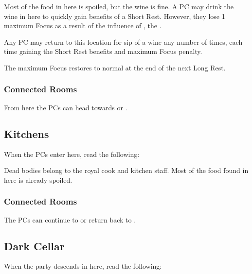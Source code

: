 Most of the food in here is spoiled, but the wine is fine. A PC may drink the wine in here to quickly gain benefits of a Short Rest. However, they lose 1 maximum Focus as a result of the influence of \npcHeartRevel{}, the \npcHeartRevelTitle{}.

Any PC may return to this location for sip of a wine any number of times, each time gaining the Short Rest benefits and maximum Focus penalty.

The maximum Focus restores to normal at the end of the next Long Rest.

\subsubsection{Connected Rooms}

From here the PCs can head towards  or .




\subsection{Kitchens}
\label{ssec:kholinarPalaceRoomsKitchen}

When the PCs enter here, read the following:


Dead bodies belong to the royal cook and kitchen staff. Most of the food found in here is already spoiled. 

\subsubsection{Connected Rooms}

The PCs can continue to  or return back to .





\subsection{Dark Cellar}
\label{ssec:kholinarPalaceRoomsCellar}

When the party descends in here, read the following:

